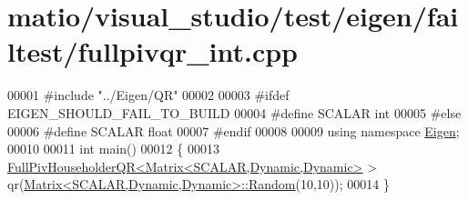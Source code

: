 \hypertarget{matio_2visual__studio_2test_2eigen_2failtest_2fullpivqr__int_8cpp_source}{}\section{matio/visual\+\_\+studio/test/eigen/failtest/fullpivqr\+\_\+int.cpp}
\label{matio_2visual__studio_2test_2eigen_2failtest_2fullpivqr__int_8cpp_source}

\begin{DoxyCode}
00001 \textcolor{preprocessor}{#include "../Eigen/QR"}
00002 
00003 \textcolor{preprocessor}{#ifdef EIGEN\_SHOULD\_FAIL\_TO\_BUILD}
00004 \textcolor{preprocessor}{#define SCALAR int}
00005 \textcolor{preprocessor}{#else}
00006 \textcolor{preprocessor}{#define SCALAR float}
00007 \textcolor{preprocessor}{#endif}
00008 
00009 \textcolor{keyword}{using namespace }\hyperlink{namespace_eigen}{Eigen};
00010 
00011 \textcolor{keywordtype}{int} main()
00012 \{
00013   \hyperlink{group___q_r___module_class_eigen_1_1_full_piv_householder_q_r}{FullPivHouseholderQR<Matrix<SCALAR,Dynamic,Dynamic>} > 
      qr(\hyperlink{group___core___module_class_eigen_1_1_matrix}{Matrix<SCALAR,Dynamic,Dynamic>::Random}(10,10));
00014 \}
\end{DoxyCode}
